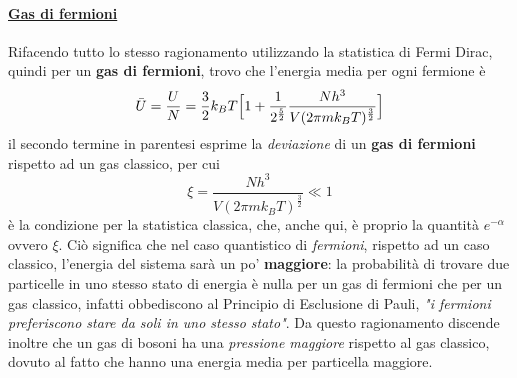 \paragraph{\underline{Gas di fermioni}} Rifacendo tutto lo stesso ragionamento utilizzando la statistica di Fermi Dirac, quindi per un \textbf{gas di fermioni}, trovo che l'energia media per ogni fermione è 
\begin{equation}
\bar U = \frac{U}{N} = \frac{3}{2} k_B T \Bigl[  1 + \frac{1}{2^{ \frac{5}{2} }} \frac{N h^3}{V (2\pi m k_B T)^{ \frac{3}{2} }} \Bigr]
\end{equation}
il secondo termine in parentesi esprime la \textit{deviazione} di un \textbf{gas di fermioni} rispetto ad un gas classico, per cui
\begin{equation}
\xi = \frac{N h^3}{V (2\pi m k_B T)^{ \frac{3}{2} }}  \ll 1 
\end{equation}
è la condizione per la statistica classica, che, anche qui, è proprio la quantità $e^{-\alpha}$ ovvero $\xi$.
Ciò significa che nel caso quantistico di \textit{fermioni}, rispetto ad un caso classico, l'energia del sistema sarà un po' \textbf{maggiore}:
la probabilità di trovare due particelle in uno stesso stato di energia è nulla per un gas di fermioni che per un gas classico, infatti obbediscono al Principio di Esclusione di Pauli, \textit{"i fermioni preferiscono stare da soli in uno stesso stato"}.
Da questo ragionamento discende inoltre che un gas di bosoni ha una \textit{pressione maggiore} rispetto al gas classico, dovuto al fatto che hanno una energia media per particella maggiore.

